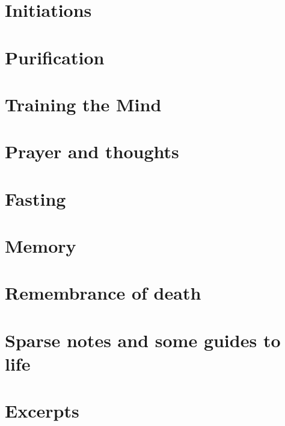 \documentclass[a4paper,12pt,twoside]{book}
\begin{document}
\chapter{Initiations}








\chapter{Purification}









\chapter{Training the Mind}




\chapter{Prayer and thoughts}





\chapter{Fasting}


\chapter{Memory}






\chapter{Remembrance of death}


\chapter{Sparse notes and some guides to life}






\chapter{Excerpts}

\end{document}
